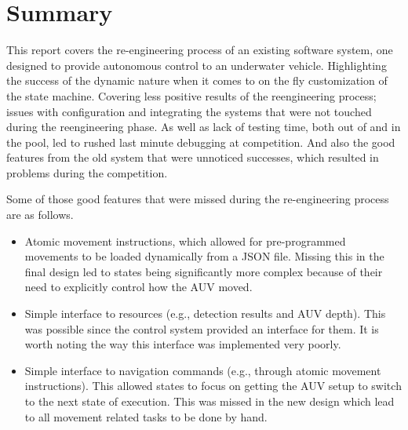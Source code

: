 \documentclass[
12pt, %
oneside, %
english, %
singlespacing, %
parskip, %
headsepline, %
chapterinoneline, %
]{MastersDoctoralThesis} %
\begin{document}

\tableofcontents %

\listoffigures %

\listoftables %

%


\newpage
\section*{Summary}

This report covers the re-engineering process of an existing software system,
one designed to provide autonomous control to an underwater vehicle.
Highlighting the success of the dynamic nature when it comes to on the fly
customization of the state machine.
Covering less positive results of the reengineering process; issues with
configuration and integrating the systems that were not
touched during the reengineering phase.
As well as lack of testing time, both out of and in the pool, led to rushed
last minute debugging at competition.
And also the good features from the old system that were unnoticed successes,
which resulted in problems during the competition.

Some of those good features that were missed during the re-engineering process
are as follows.

\begin{itemize}
\item Atomic movement instructions, which allowed for pre-programmed movements
  to be loaded dynamically from a \gls{JSON} file. Missing this in the final
  design led to states being significantly more complex because of their need to
  explicitly control how the AUV moved.
\item Simple interface to resources (e.g., detection results and AUV depth).
  This was possible since the control system provided an interface for them. It
  is worth noting the way this interface was implemented very poorly.
\item Simple interface to navigation commands (e.g., through atomic movement
  instructions). This allowed states to focus on getting the AUV setup to switch
  to the next state of execution. This was missed in the new design which lead
  to all movement related tasks to be done by hand.
\end{itemize}
\end{document}
